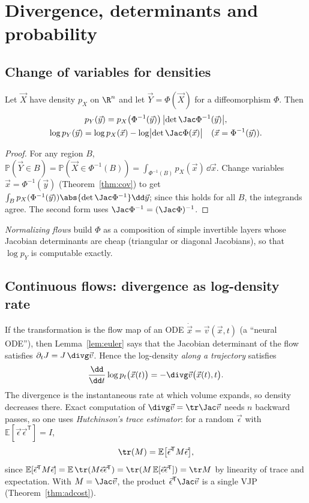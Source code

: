 \section{Divergence, determinants and probability}

\subsection{Change of variables for densities}

Let $\vec X$ have density $p_X$ on $\R^n$ and let $\vec Y=\Phi(\vec X)$ for a diffeomorphism $\Phi$. Then
\begin{gather*}
p_Y(\vec y)=p_X\bigl(\Phi^{-1}(\vec y)\bigr)\,\bigl|\det\Jac\Phi^{-1}(\vec y)\bigr|,\\
\log p_Y(\vec y)=\log p_X(\vec x)-\log\bigl|\det\Jac\Phi(\vec x)\bigr|\quad(\vec x=\Phi^{-1}(\vec y)).
\end{gather*}

\begin{proof}
For any region $B$, $\mathbb P(\vec Y\in B)=\mathbb P(\vec X\in\Phi^{-1}(B))=\int_{\Phi^{-1}(B)}p_X(\vec x)\,\dd\vec x$. Change variables $\vec x=\Phi^{-1}(\vec y)$ (Theorem~\ref{thm:cov}) to get $\int_Bp_X(\Phi^{-1}(\vec y))\abs{\det\Jac\Phi^{-1}}\dd\vec y$; since this holds for all $B$, the integrands agree. The second form uses $\Jac\Phi^{-1}=(\Jac\Phi)^{-1}$.
\end{proof}

\emph{Normalizing flows} build $\Phi$ as a composition of simple invertible layers whose Jacobian determinants are cheap (triangular or diagonal Jacobians), so that $\log p_Y$ is computable exactly.

\subsection{Continuous flows: divergence as log-density rate}

If the transformation is the flow map of an ODE $\dot{\vec x}=\vec v(\vec x,t)$ (a ``neural ODE''), then Lemma~\ref{lem:euler} says that the Jacobian determinant of the flow satisfies $\partial_tJ=J\,\divg\vec v$. Hence the log-density \emph{along a trajectory} satisfies
\[
\frac{\dd}{\dd t}\log p_t\bigl(\vec x(t)\bigr)=-\divg\vec v\bigl(\vec x(t),t\bigr).
\]
The divergence is the instantaneous rate at which volume expands, so density decreases there. Exact computation of $\divg\vec v=\tr\Jac\vec v$ needs $n$ backward passes, so one uses \emph{Hutchinson's trace estimator}: for a random $\vec\epsilon$ with $\mathbb E[\vec\epsilon\vec\epsilon^{\mathsf T}]=I$,
\[
\tr(M)=\mathbb E\bigl[\vec\epsilon^{\mathsf T}M\vec\epsilon\bigr],
\]
since $\mathbb E[\vec\epsilon^{\mathsf T}M\vec\epsilon]=\mathbb E\,\tr(M\vec\epsilon\vec\epsilon^{\mathsf T})=\tr(M\,\mathbb E[\vec\epsilon\vec\epsilon^{\mathsf T}])=\tr M$ by linearity of trace and expectation. With $M=\Jac\vec v$, the product $\vec\epsilon^{\mathsf T}\Jac\vec v$ is a single VJP (Theorem~\ref{thm:adcost}).

